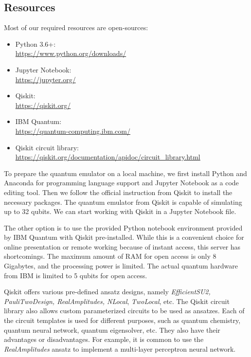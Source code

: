 \subsection{Resources} \label{Resources section}
Most of our required resources are open-sources:
\begin{itemize}
    \item Python 3.6+:\\ \url{https://www.python.org/downloads/}
    \item Jupyter Notebook:\\ \url{https://jupyter.org/}
    \item Qiskit:\\
    \url{https://qiskit.org/}
    \item IBM Quantum:\\ \url{https://quantum-computing.ibm.com/}
    \item Qiskit circuit library:\\ \url{https://qiskit.org/documentation/apidoc/circuit_library.html}
\end{itemize}

To prepare the quantum emulator on a local machine, we first install Python and Anaconda for programming language support and Jupyter Notebook as a code editing tool.
Then we follow the official instruction from Qiskit \cite{Qiskit} to install the necessary packages.
The quantum emulator from Qiskit is capable of simulating up to 32 qubits.
We can start working with Qiskit in a Jupyter Notebook file.

The other option is to use the provided Python notebook environment provided by IBM Quantum with Qiskit pre-installed.
While this is a convenient choice for online presentation or remote working because of instant access, this server has shortcomings.
The maximum amount of RAM for open access is only 8 Gigabytes, and the processing power is limited.
The actual quantum hardware from IBM is limited to 5 qubits for open access.

Qiskit offers various pre-defined ansatz designs, namely \textit{EfficientSU2, PauliTwoDesign, RealAmplitudes, NLocal}, \textit{TwoLocal}, etc.
The Qiskit circuit library also allows custom parameterized circuits to be used as ansatzes.
Each of the circuit templates is used for different purposes, such as quantum chemistry, quantum neural network, quantum eigensolver, etc.
They also have their advantages or disadvantages.
For example, it is common to use the \textit{RealAmplitudes} ansatz to implement a multi-layer perceptron neural network.